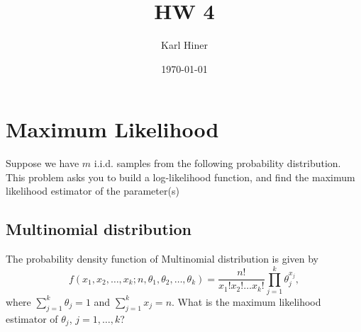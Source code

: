 \documentclass{article}
\title{HW 4}
\author{Karl Hiner}
\date{\today}
\begin{document}
\maketitle	

\section{Maximum Likelihood}

Suppose we have $m$ i.i.d. samples from the following probability distribution.
This problem asks you to build a log-likelihood function, and find the maximum likelihood estimator of the parameter(s)

\subsection{Multinomial distribution}

The probability density function of Multinomial distribution is given by
$$f(x_1,x_2, \dots, x_k ; n,\theta_1, \theta_2, \dots, \theta_k) = \frac{n!}{x_1!x_2!\dots x_k!} \prod_{j=1}^k \theta_j^{x_j},$$
where $\sum_{j=1}^k \theta_j = 1$ and $\sum_{j=1}^k x_j = n$.
What is the maximum likelihood estimator of $\theta_j$, $j = 1, \dots, k$?
\end{document}
